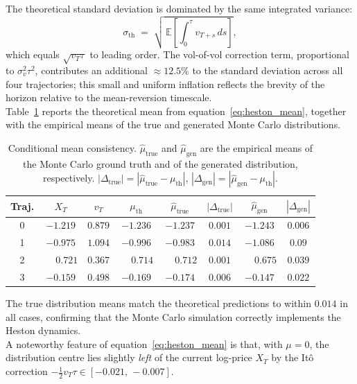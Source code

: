 The theoretical standard deviation is dominated by the same integrated variance:
\begin{equation}
    \sigma_{\mathrm{th}} \;=\; \sqrt{\,\mathbb{E}\!\left[\int_0^\tau v_{T+s}\,ds\right]},
    \label{eq:std_th}
\end{equation}
which equals $\sqrt{v_T\tau}$ to leading order.  The vol-of-vol correction
term, proportional to $\sigma_v^2\tau^2$, contributes an additional
$\approx 12.5\%$ to the standard deviation across all four trajectories;
this small and uniform inflation reflects the brevity of the horizon relative
to the mean-reversion timescale.\\


Table~\ref{tab:mean_consistency} reports the theoretical mean from
equation~\eqref{eq:heston_mean}, together with the empirical means of the
true and generated Monte Carlo distributions.

\begin{table}[H]
\centering
\caption{Conditional mean consistency.  $\hat{\mu}_{\mathrm{true}}$ and
$\hat{\mu}_{\mathrm{gen}}$ are the empirical means of the Monte Carlo ground
truth and of the generated distribution, respectively.
$|\Delta_{\mathrm{true}}|=|\hat{\mu}_{\mathrm{true}}-\mu_{\mathrm{th}}|$,
$|\Delta_{\mathrm{gen}}|=|\hat{\mu}_{\mathrm{gen}}-\mu_{\mathrm{th}}|$.}
\label{tab:mean_consistency}
\begin{tabular}{cccccccc}
\toprule
Traj. & $X_T$ & $v_T$ & $\mu_{\mathrm{th}}$
      & $\hat{\mu}_{\mathrm{true}}$ & $|\Delta_{\mathrm{true}}|$
      & $\hat{\mu}_{\mathrm{gen}}$\phantom{$|$}
      & $|\Delta_{\mathrm{gen}}|$ \\
\midrule
0 & $-1.219$ & $0.879$ & $-1.236$ & $-1.237$ & $0.001$ & $-1.243$ & $0.006$\\
1 & $-0.975$ & $1.094$ & $-0.996$ & $-0.983$ & $0.014$ & $-1.086$ & $0.09$\\
2 & $\phantom{-}0.721$ & $0.367$  & $\phantom{-}0.714$ & $\phantom{-}0.712$ & $0.001$ & $\phantom{-}0.675$ & $0.039$ \\
3 & $-0.159$ & $0.498$ & $-0.169$ & $-0.174$ & $0.006$ & $-0.147$ & $0.022$\\
\bottomrule
\end{tabular}
\end{table}

The true distribution means match the theoretical predictions to within
$0.014$ in all cases, confirming that the Monte Carlo simulation correctly
implements the Heston dynamics.\\
A noteworthy feature of equation~\eqref{eq:heston_mean} is that, with $\mu=0$,
the distribution centre lies slightly \emph{left} of the current log-price
$X_T$ by the It\^{o} correction $-\tfrac{1}{2}v_T\tau \in [-0.021,\,-0.007]$.\\


